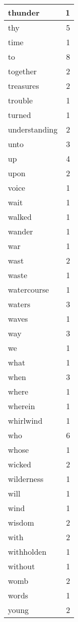 \begin{center}
\begin{longtable}{l|r}
thunder & 1 \\ \hline
thy & 5 \\ \hline
time & 1 \\ \hline
to & 8 \\ \hline
together & 2 \\ \hline
treasures & 2 \\ \hline
trouble & 1 \\ \hline
turned & 1 \\ \hline
understanding & 2 \\ \hline
unto & 3 \\ \hline
up & 4 \\ \hline
upon & 2 \\ \hline
voice & 1 \\ \hline
wait & 1 \\ \hline
walked & 1 \\ \hline
wander & 1 \\ \hline
war & 1 \\ \hline
wast & 2 \\ \hline
waste & 1 \\ \hline
watercourse & 1 \\ \hline
waters & 3 \\ \hline
waves & 1 \\ \hline
way & 3 \\ \hline
we & 1 \\ \hline
what & 1 \\ \hline
when & 3 \\ \hline
where & 1 \\ \hline
wherein & 1 \\ \hline
whirlwind & 1 \\ \hline
who & 6 \\ \hline
whose & 1 \\ \hline
wicked & 2 \\ \hline
wilderness & 1 \\ \hline
will & 1 \\ \hline
wind & 1 \\ \hline
wisdom & 2 \\ \hline
with & 2 \\ \hline
withholden & 1 \\ \hline
without & 1 \\ \hline
womb & 2 \\ \hline
words & 1 \\ \hline
young & 2 \\ \hline
\end{longtable}
\end{center}




